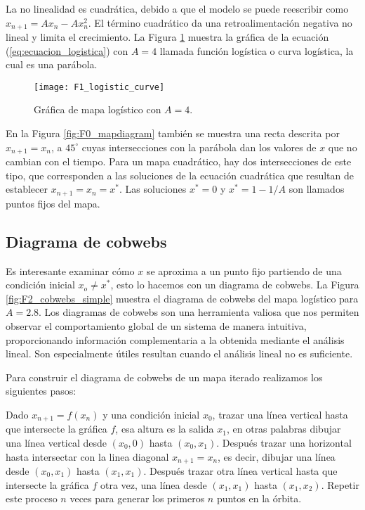        La no linealidad es cuadrática, debido a que el modelo se puede reescribir como $x_{n+1} = A x_{n} - A x_{n}^{2}$. El término cuadrático da una retroalimentación negativa no lineal y limita el crecimiento. La Figura \ref{fig:F1_logistic_curve} muestra la gráfica de la ecuación (\ref{eq:ecuacion_logistica}) con $A = 4$ llamada función logística o curva logística, la cual es una parábola.

        \begin{figure}[hbtp]
            \caption{Gráfica de mapa logístico con $A = 4$.}
            \centering
            \texttt{[image: F1\_logistic\_curve]}
            \label{fig:F1_logistic_curve}
        \end{figure}

        En la Figura \ref{fig:F0_mapdiagram} también se muestra una recta descrita por $x_{n+1} = x_{n}$, a $45^{\circ}$ cuyas intersecciones con la parábola dan los valores de $x$ que no cambian con el tiempo. Para un mapa cuadrático, hay dos intersecciones de este tipo, que corresponden a las soluciones de la ecuación cuadrática que resultan de establecer $x_{n+1} = x_{n} = x^{*}$. Las soluciones $x^{*} = 0$ y $x^{*} = 1 - 1/A$ son llamados puntos fijos del mapa.

        \subsection{Diagrama de cobwebs}

            Es interesante examinar cómo $x$ se aproxima a un punto fijo partiendo de una condición inicial $x_{o} \neq x^{*}$, esto lo hacemos con un diagrama de cobwebs. La Figura \ref{fig:F2_cobwebs_simple} muestra el diagrama de cobwebs del mapa logístico para $A = 2.8$. Los diagramas de cobwebs son una herramienta valiosa que nos permiten observar el comportamiento global de un sistema de manera intuitiva, proporcionando información complementaria a la obtenida mediante el análisis lineal. Son especialmente útiles resultan cuando el análisis lineal no es suficiente.

            Para construir el diagrama de cobwebs de un mapa iterado realizamos los siguientes pasos:

            Dado $x_{n+1} = f(x_{n})$ y una condición inicial $x_{0}$, trazar una línea vertical hasta que intersecte la gráfica $f$, esa altura es la salida $x_{1}$, en otras palabras dibujar una línea vertical desde $(x_{0}, 0) $ hasta $(x_{0}, x_{1})$. Después trazar una horizontal hasta intersectar con la linea diagonal $x_{n+1} = x_{n}$, es decir, dibujar una línea desde  $(x_{0}, x_{1}) $ hasta $(x_{1}, x_{1})$. Después trazar otra línea vertical hasta que intersecte la gráfica $f$ otra vez, una línea desde $(x_{1}, x_{1}) $ hasta $(x_{1}, x_{2})$. Repetir este proceso $n$ veces para generar los primeros $n$ puntos en la órbita.

